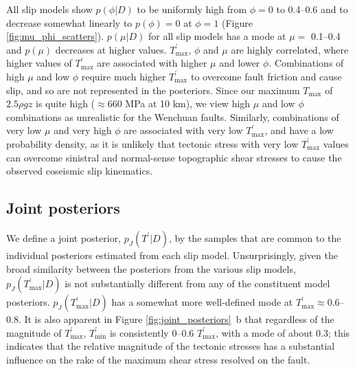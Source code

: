 \documentclass[draft,jgrga]{AGUTeX}
\begin{document}
\begin{article}
All slip models show $p(\phi | D)$ to be uniformly high from $\phi = 0$
to 0.4--0.6 and to decrease somewhat linearly to $p(\phi) = 0$ at $\phi = 1$
(Figure \ref{fig:mu_phi_scatters}). $p(\mu | D)$ for all slip models has
a mode at $\mu =$ 0.1--0.4 and $p(\mu)$ decreases at higher values.
$T^\prime_{\mathrm{max}}$, $\phi$ and $\mu$ are highly correlated, where
higher values of $T^\prime_{\mathrm{max}}$ are associated with higher
$\mu$ and lower $\phi$. Combinations of high $\mu$ and low $\phi$
require much higher $T^\prime_{\mathrm{max}}$ to overcome fault friction
and cause slip, and so are not represented in the posteriors. Since our
maximum $T_{\mathrm{max}}$ of $2.5 \rho g z$ is quite high
($\approx 660$ MPa at 10 km), we view high $\mu$ and low $\phi$
combinations as unrealistic for the Wenchuan faults. Similarly,
combinations of very low $\mu$ and very high $\phi$ are associated with
very low $T^\prime_{\mathrm{max}}$, and have a low probability density,
as it is unlikely that tectonic stress with very low $T^\prime_{\mathrm{max}}$
values can
overcome sinistral and normal-sense topographic shear stresses to cause
the observed coseismic slip kinematics.


\subsection{Joint posteriors}\label{joint-posteriors}

We define a joint posterior, $p_{J}(T^\prime | D)$, by the samples that 
are common to the individual posteriors estimated from each slip model.
Unsurprisingly, given the broad similarity between the posteriors from
the various slip models, $p_{J}(T^\prime_{\mathrm{max}} | D)$ is not
substantially different from any of the constituent model posteriors.
$p_{J}(T^\prime_{\mathrm{max}} | D)$ has a somewhat more well-defined
mode at $T^\prime_{\mathrm{max}} \approx$0.6--0.8. It is also apparent in
Figure \ref{fig:joint_posteriors}~b that regardless of the magnitude of
$T^\prime_{\mathrm{max}}$, $T^\prime_{\mathrm{min}}$ is
consistently 0--0.6 $T^\prime_{\mathrm{max}}$, with a mode
of about 0.3; this indicates that the relative magnitude of the
tectonic stresses has a substantial influence on the rake of the maximum
shear stress resolved on the fault.


\end{article}
\end{document}
